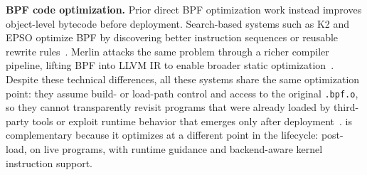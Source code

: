 \noindent\textbf{BPF code optimization.}
Prior direct BPF optimization work instead improves object-level bytecode before deployment. Search-based systems such as K2 and EPSO optimize BPF by discovering better instruction sequences or reusable rewrite rules~\cite{k2,epso}. Merlin attacks the same problem through a richer compiler pipeline, lifting BPF into LLVM IR to enable broader static optimization~\cite{merlin}. 
%
Despite these technical differences, all these systems share the same optimization point: they assume build- or load-path control and access to the original \texttt{.bpf.o}, so they cannot transparently revisit programs that were already loaded by third-party tools or exploit runtime behavior that emerges only after deployment~\cite{k2,merlin,epso}. \tool is complementary because it optimizes at a different point in the lifecycle: post-load, on live programs, with runtime guidance and backend-aware kernel instruction support.

